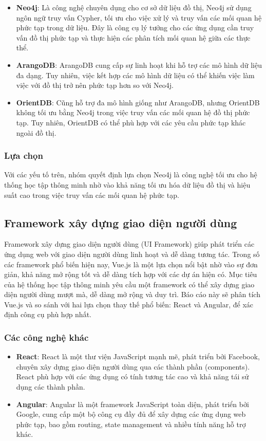 \begin{itemize} \item \textbf{Neo4j}: Là công nghệ chuyên dụng cho cơ sở dữ liệu đồ thị, Neo4j sử dụng ngôn ngữ truy vấn Cypher, tối ưu cho việc xử lý và truy vấn các mối quan hệ phức tạp trong dữ liệu. Đây là công cụ lý tưởng cho các ứng dụng cần truy vấn đồ thị phức tạp và thực hiện các phân tích mối quan hệ giữa các thực thể. \item \textbf{ArangoDB}: ArangoDB cung cấp sự linh hoạt khi hỗ trợ các mô hình dữ liệu đa dạng. Tuy nhiên, việc kết hợp các mô hình dữ liệu có thể khiến việc làm việc với đồ thị trở nên phức tạp hơn so với Neo4j. \item \textbf{OrientDB}: Cũng hỗ trợ đa mô hình giống như ArangoDB, nhưng OrientDB không tối ưu bằng Neo4j trong việc truy vấn các mối quan hệ đồ thị phức tạp. Tuy nhiên, OrientDB có thể phù hợp với các yêu cầu phức tạp khác ngoài đồ thị. \end{itemize}

\subsubsection{Lựa chọn}

Với các yếu tố trên, nhóm quyết định lựa chọn Neo4j là công nghệ tối ưu cho hệ thống học tập thông minh nhờ vào khả năng tối ưu hóa dữ liệu đồ thị và hiệu suất cao trong việc truy vấn các mối quan hệ phức tạp.
\subsection{Framework xây dựng giao diện người dùng}

Framework xây dựng giao diện người dùng (UI Framework) giúp phát triển các ứng dụng web với giao diện người dùng linh hoạt và dễ dàng tương tác. Trong số các framework phổ biến hiện nay, Vue.js là một lựa chọn nổi bật nhờ vào sự đơn giản, khả năng mở rộng tốt và dễ dàng tích hợp với các dự án hiện có. Mục tiêu của hệ thống học tập thông minh yêu cầu một framework có thể xây dựng giao diện người dùng mượt mà, dễ dàng mở rộng và duy trì. Báo cáo này sẽ phân tích Vue.js và so sánh với hai lựa chọn thay thế phổ biến: React và Angular, để xác định công cụ phù hợp nhất.

\subsubsection{Các công nghệ khác}

\begin{itemize} \item \textbf{React}: React là một thư viện JavaScript mạnh mẽ, phát triển bởi Facebook, chuyên xây dựng giao diện người dùng qua các thành phần (components). React phù hợp với các ứng dụng có tính tương tác cao và khả năng tái sử dụng các thành phần. \item \textbf{Angular}: Angular là một framework JavaScript toàn diện, phát triển bởi Google, cung cấp một bộ công cụ đầy đủ để xây dựng các ứng dụng web phức tạp, bao gồm routing, state management và nhiều tính năng hỗ trợ khác. \end{itemize}

